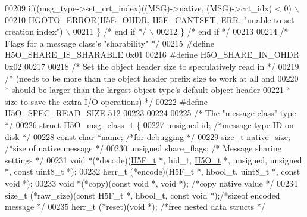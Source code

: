 \begin{DoxyCode}
00209 \textcolor{preprocessor}{            if((msg\_type->set\_crt\_index)((MSG)->native, (MSG)->crt\_idx) < 0)  \(\backslash\)}
00210 \textcolor{preprocessor}{                HGOTO\_ERROR(H5E\_OHDR, H5E\_CANTSET, ERR, "unable to set creation index") \(\backslash\)}
00211 \textcolor{preprocessor}{        \} }\textcolor{comment}{/* end if */}\textcolor{preprocessor}{                                \(\backslash\)}
00212 \textcolor{preprocessor}{    \} }\textcolor{comment}{/* end if */}\textcolor{preprocessor}{}
00213 
00214 \textcolor{comment}{/* Flags for a message class's "sharability" */}
00215 \textcolor{preprocessor}{#define H5O\_SHARE\_IS\_SHARABLE   0x01}
00216 \textcolor{preprocessor}{#define H5O\_SHARE\_IN\_OHDR       0x02}
00217 
00218 \textcolor{comment}{/* Set the object header size to speculatively read in */}
00219 \textcolor{comment}{/* (needs to be more than the object header prefix size to work at all and}
00220 \textcolor{comment}{ *      should be larger than the largest object type's default object header}
00221 \textcolor{comment}{ *      size to save the extra I/O operations) */}
00222 \textcolor{preprocessor}{#define H5O\_SPEC\_READ\_SIZE 512}
00223 
00224 
00225 \textcolor{comment}{/* The "message class" type */}
00226 \textcolor{keyword}{struct }\hyperlink{struct_h5_o__msg__class__t}{H5O\_msg\_class\_t} \{
00227     \textcolor{keywordtype}{unsigned}    id;             \textcolor{comment}{/*message type ID on disk   */}
00228     \textcolor{keyword}{const} \textcolor{keywordtype}{char}  *name;              \textcolor{comment}{/*for debugging             */}
00229     \textcolor{keywordtype}{size\_t}  native\_size;            \textcolor{comment}{/*size of native message    */}
00230     \textcolor{keywordtype}{unsigned}    share\_flags;            \textcolor{comment}{/* Message sharing settings */}
00231     \textcolor{keywordtype}{void}    *(*decode)(\hyperlink{struct_h5_f__t}{H5F\_t} *, hid\_t, \hyperlink{struct_h5_o__t}{H5O\_t} *, unsigned, \textcolor{keywordtype}{unsigned} *, \textcolor{keyword}{const} uint8\_t *);
00232     herr\_t  (*encode)(H5F\_t *, hbool\_t, uint8\_t *, \textcolor{keyword}{const} \textcolor{keywordtype}{void} *);
00233     \textcolor{keywordtype}{void}    *(*copy)(\textcolor{keyword}{const} \textcolor{keywordtype}{void} *, \textcolor{keywordtype}{void} *); \textcolor{comment}{/*copy native value         */}
00234     size\_t  (*raw\_size)(\textcolor{keyword}{const} H5F\_t *, hbool\_t, \textcolor{keyword}{const} \textcolor{keywordtype}{void} *);\textcolor{comment}{/*sizeof encoded message  */}
00235     herr\_t  (*reset)(\textcolor{keywordtype}{void} *);       \textcolor{comment}{/*free nested data structs  */}

\end{DoxyCode}
